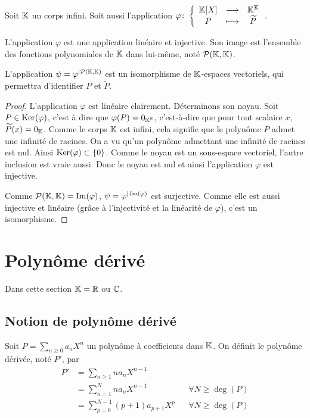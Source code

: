 Soit \(\mathbb{K}\) un corps infini. Soit aussi l'application \(\varphi\colon \left\{\begin{array}{ccc} \mathbb{K}[X] & \longrightarrow &\mathbb{K}^{\mathbb{K}}\\ P & \longmapsto & \widetilde{P} \end{array} \right.\).

\begin{prop}
  L'application \(\varphi\) est une application linéaire et injective. Son image est l'ensemble des fonctions polynomiales de \(\mathbb{K}\) dans lui-même, noté \(\mathcal{P}(\mathbb{K},\mathbb{K})\).

  L'application \(\psi = \varphi^{|\mathcal{P}(\mathbb{K},\mathbb{K})}\) est un isomorphisme de \(\mathbb{K}\)-espaces vectoriels, qui permettra d'identifier \(P\) et \(\widetilde{P}\).
\end{prop}
\begin{proof}
  L'application \(\varphi\) est linéaire clairement. Déterminons son noyau. Soit \(P \in \operatorname{Ker}(\varphi)\), c'est à dire que \(\varphi(P)=0_{\mathbb{K}^{\mathbb{K}}}\), c'est-à-dire que pour tout scalaire \(x\), \(\widetilde{P}(x) = 0_{\mathbb{K}}\). Comme le corps \(\mathbb{K}\) est infini, cela signifie que le polynôme \(P\) admet une infinité de racines. On a vu qu'un polynôme admettant une infinité de racines est nul. Ainsi \(\operatorname{Ker}(\varphi) \subset \{0\}\). Comme le noyau est un sous-espace vectoriel, l'autre inclusion est vraie aussi. Donc le noyau est nul et ainsi l'application \(\varphi\) est injective.

  Comme \(\mathcal{P}(\mathbb{K},\mathbb{K}) = \operatorname{Im}(\varphi)\), \(\psi=\varphi^{|\operatorname{Im}(\varphi)}\) est surjective. Comme elle est aussi injective et linéaire (grâce à l'injectivité et la linéarité de \(\varphi\)), c'est un isomorphisme.
\end{proof}

\section{Polynôme dérivé}

Dans cette section \(\mathbb{K}=\mathbb{R}\) ou \(\mathbb{C}\).

\subsection{Notion de polynôme dérivé}

\begin{defdef}
  Soit \(P = \sum_{n \geqslant 0}a_n X^n\) un polynôme à coefficients dans \(\mathbb{K}\). On définit le polynôme dérivée, noté \(P'\), par
  \begin{align}
    P' &= \sum_{n \geqslant 1} na_n X^{n-1} \\
    &=\sum_{n=1}^N na_n X^{n-1} && \forall N \geqslant \deg(P) \\
    &=\sum_{p=0}^{N-1} (p+1)a_{p+1} X^{p} && \forall N \geqslant \deg(P) \\
  \end{align}
\end{defdef}

